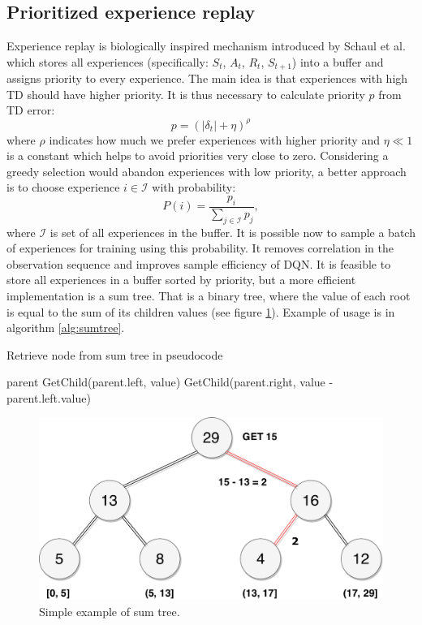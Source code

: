 \clearpage

\subsection{Prioritized experience replay}
Experience replay is biologically inspired mechanism introduced by Schaul et al. \cite{schaul2015} which stores all experiences (specifically: $S_t$, $A_t$, $R_{t}$, $S_{t+1}$) into a buffer and assigns priority to every experience. The main idea is that experiences with high TD should have higher priority. It is thus necessary to calculate priority $p$ from TD error:
\begin{equation}
p = (|\delta_t | + \eta)^\rho
\end{equation}
where $\rho$ indicates how much we prefer experiences with higher priority and $\eta \ll 1$ is a constant which helps to avoid priorities very close to zero. Considering a greedy selection would abandon experiences with low priority, a better approach is to choose experience $i \in \mathcal{I}$ with probability:
\begin{equation}
P(i) = \frac{p_i}{\sum\limits_{j \in \mathcal{I}} p_j},
\end{equation}
where $\mathcal{I}$ is set of all experiences in the buffer. It is possible now to sample a batch of experiences for training using this probability. It removes correlation in the observation sequence and improves sample efficiency of DQN. It is feasible to store all experiences in a buffer sorted by priority, but a more efficient implementation is a sum tree. That is a binary tree, where the value of each root is equal to the sum of its children values (see figure \ref{fig:sumtree}). Example of usage is in algorithm \ref{alg:sumtree}.
\begin{algorithm}
\caption{Retrieve node from sum tree in pseudocode}
\begin{algorithmic}[1]\label{alg:sumtree}
 \Return parent \EndIf
{} 
\State \Return GetChild(parent.left, value)
\Else 
\State \Return GetChild(parent.right, value - parent.left.value)
\EndIf
\EndFunction
\end{algorithmic}
\end{algorithm}
\begin{figure}[H]
\centering
\includegraphics[scale=0.5]{fig/sumtree.pdf}
\caption[Sum tree]{Simple example of sum tree.}
\label{fig:sumtree}
\end{figure}
\clearpage
